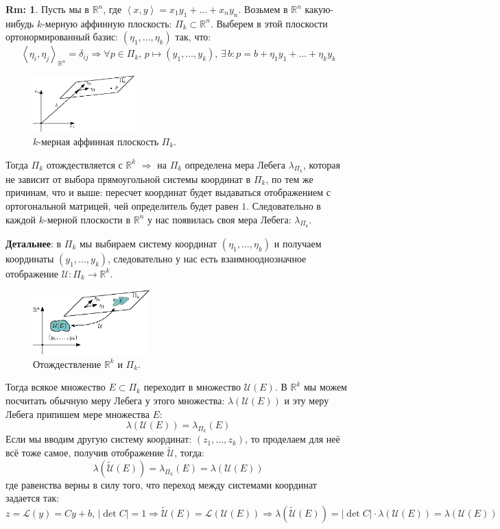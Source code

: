 \documentclass[12pt]{article}
\newcommand{\MR}{\mathbb{R}}
\newcommand{\MU}{\mathcal{U}}
\newcommand{\ML}{\mathcal{L}}
\theoremstyle{definition}
\newtheorem{rem}{Rm:}
\newcommand{\inner}[2]{\left\langle #1, #2 \right\rangle }
\newcommand{\wte}[1]{\widetilde{#1}}
\begin{document}
\begin{rem}
	Пусть мы в $\MR^n$, где $\inner{x}{y} = x_1 y_1 + \dotsc + x_n y_n$. Возьмем в $\MR^n$ какую-нибудь $k$-мерную аффинную плоскость: $\Pi_k \subset \MR^n$. Выберем в этой плоскости ортонормированный базис: $(\eta_1, \dotsc, \eta_k)$ так, что: 
	$$
		\inner{\eta_i}{\eta_j}_{\MR^n} = \delta_{ij} \Rightarrow \forall p \in \Pi_k, \, p \mapsto (y_1,\dotsc,y_k), \, \exists \, b \colon p = b + \eta_1 y_1 + \dotsc + \eta_k y_k
	$$
	\begin{figure}[H]
		\centering
		\includegraphics[width=0.35\textwidth]{MA4L12_7.eps}
		\caption{$k$-мерная аффинная плоскость $\Pi_k$.}
		\label{12_7}
	\end{figure}
	Тогда $\Pi_k$ отождествляется с $\MR^k$ $\Rightarrow$ на $\Pi_k$ определена мера Лебега $\lambda_{\Pi_k}$, которая не зависит от выбора прямоугольной системы координат в $\Pi_k$, по тем же причинам, что и выше: пересчет координат будет выдаваться отображением с ортогональной матрицей, чей определитель будет равен $1$. Следовательно в каждой $k$-мерной плоскости в $\MR^n$ у нас появилась своя мера Лебега: $\lambda_{\Pi_k}$.
	
	\textbf{Детальнее}: в $\Pi_k$ мы выбираем систему координат $(\eta_1,\dotsc,\eta_k)$ и получаем координаты $(y_1,\dotsc, y_k)$, следовательно у нас есть взаимнооднозначное отображение $\MU \colon \Pi_k \to \MR^k$. 
	\begin{figure}[H]
		\centering
		\includegraphics[width=0.4\textwidth]{MA4L12_8.eps}
		\caption{Отождествление $\MR^k$ и $\Pi_k$.}
		\label{12_8}
	\end{figure}
	Тогда всякое множество $E \subset \Pi_k$ переходит в множество $\MU(E)$. В $\MR^k$ мы можем посчитать обычную меру Лебега у этого множества: $\lambda(\MU(E))$ и эту меру Лебега припишем мере множества $E$:
	$$
		\lambda(\MU(E)) = \lambda_{\Pi_k}(E)
	$$
	Если мы вводим другую систему координат: $(z_1,\dotsc, z_k)$, то проделаем для неё всё тоже самое, получив отображение $\wte{\MU}$, тогда:
	$$
		\lambda(\wte{\MU}(E)) = \lambda_{\Pi_k}(E) = \lambda(\MU(E))
	$$
	где равенства верны в силу того, что переход между системами координат задается так:
	$$
		z  = \ML (y)= Cy + b, \, |\det{C}| = 1 \Rightarrow \wte{\MU}(E) = \ML(\MU(E)) \Rightarrow \lambda(\wte{\MU}(E)) = |\det{C}|{\cdot}\lambda(\MU(E)) = \lambda(\MU(E))
	$$
\end{rem}
\end{document}
